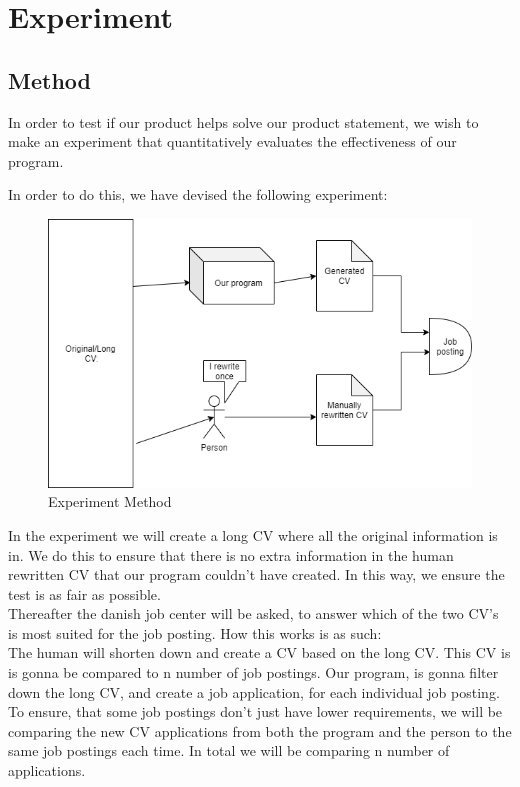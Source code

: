 \section{Experiment}\label{sec:method}
\subsection{Method}
In order to test if our product helps solve our product statement, we wish
to make an experiment that quantitatively evaluates the effectiveness of our
program. 

In order to do this, we have devised the following experiment:
\begin{figure}[H]
  \centering
  \includegraphics[scale = 0.6]{figures/experiment1.png}
  \caption{Experiment Method}\label{fig:ie}
\end{figure} 
In the experiment we will create a long CV where all the original information
is in. We do this to ensure that there is no extra information in the human 
rewritten CV that our program couldn't have created. In this way, we ensure
the test is as fair as possible.\\

Thereafter the danish job center will be asked, to answer which of the two CV's is most suited
for the job posting. How this works is as such: \\

The human will shorten down and create a CV based on the long CV. This CV is
is gonna be compared to n number of job postings.
Our program, is gonna filter down the long CV, and create a job application,
for each individual job posting. 
To ensure, that some job postings don't just have lower requirements, we will be
comparing the new CV applications from both the program and the person to the same 
job postings each time. In total we will be comparing n number of applications. \\

